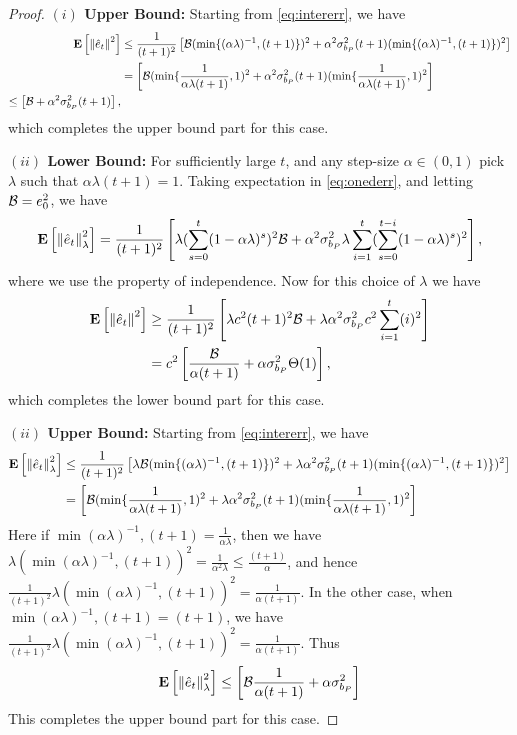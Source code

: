 \begin{proof}
\textbf{$(i)$ Upper Bound:}
Starting from \eqref{eq:intererr}, we have
\begin{align}
\mathbf{E}\left[\left\| \hat{e}_t\right\|^2\right]&\leq \frac{1}{(t+1)^2}\left[\mathcal{B} (\min\{(\alpha\lambda)^{-1},(t+1)\})^2+ \alpha^2 \sigma^2_{b_P} (t+1) (\min\{(\alpha\lambda)^{-1},(t+1)\})^2 \right]\\
&= \left[\mathcal{B} (\min\{\frac{1}{\alpha \lambda (t+1)},1)^2+ \alpha^2 \sigma^2_{b_P} (t+1) (\min\{\frac{1}{\alpha \lambda (t+1)},1)^2 \right]\\
\leq \left[\mathcal{B} + \alpha^2 \sigma^2_{b_P} (t+1) \right], 
\end{align}
which completes the upper bound part for this case.

\textbf{$(ii)$ Lower Bound:}
For sufficiently large $t$, and any step-size $\alpha \in (0,1)$ pick $\lambda$ such that $\alpha \lambda (t+1)=1$. Taking expectation in \eqref{eq:onederr}, and letting $\mathcal{B}=e_0^2$, we have
\begin{align}\label{eq:intererr}
\mathbf{E}\left[\left\| \hat{e}_t\right\|^2_{\lambda}\right]=\frac{1}{(t+1)^2}\left[ \lambda (\sum_{s=0}^t(1-\alpha \lambda)^s)^2 \mathcal{B}+ \alpha^2\sigma^2_{b_P}\lambda \sum_{i=1}^t (\sum_{s=0}^{t-i} (1-\alpha \lambda)^s)^2\right],
\end{align}
where we use the property of independence. Now for this choice of $\lambda$ we have
\begin{align}
\mathbf{E}\left[\left\| \hat{e}_t\right\|^2\right]&\geq \frac{1}{(t+1)^2}\left[ \lambda c^2(t+1)^2 \mathcal{B}+ \lambda \alpha^2\sigma^2_{b_P} c^2\sum_{i=1}^t (i)^2\right]\\
&= c^2\left[\frac{\mathcal{B}}{\alpha (t+1)}+ \alpha  \sigma^2_{b_P} \Theta(1) \right],
\end{align}
which completes the lower bound part for this case.

\textbf{$(ii)$ Upper Bound:}
Starting from \eqref{eq:intererr}, we have
\begin{align}
\mathbf{E}\left[\left\| \hat{e}_t\right\|^2_{\lambda}\right]&\leq \frac{1}{(t+1)^2}\left[\lambda \mathcal{B} (\min\{(\alpha\lambda)^{-1},(t+1)\})^2+ \lambda \alpha^2 \sigma^2_{b_P} (t+1) (\min\{(\alpha\lambda)^{-1},(t+1)\})^2 \right]\\
&= \left[\mathcal{B} (\min\{\frac{1}{\alpha \lambda (t+1)},1)^2+ \lambda \alpha^2 \sigma^2_{b_P} (t+1) (\min\{\frac{1}{\alpha \lambda (t+1)},1)^2 \right]\\
\end{align}
Here if $\min{(\alpha\lambda)^{-1},(t+1)}=\frac{1}{\alpha \lambda}$, then we have $\lambda(\min{(\alpha\lambda)^{-1},(t+1)})^2=\frac{1}{\alpha^2 \lambda}\leq \frac{(t+1)}{\alpha}$, and hence $\frac{1}{(t+1)^2}\lambda(\min{(\alpha\lambda)^{-1},(t+1)})^2=\frac{1}{\alpha (t+1)}$. In the other case, when $\min{(\alpha\lambda)^{-1},(t+1)}=(t+1)$, we have
$\frac{1}{(t+1)^2}\lambda(\min{(\alpha\lambda)^{-1},(t+1)})^2=\frac{1}{\alpha (t+1)}$. Thus
\begin{align}
\mathbf{E}\left[\left\| \hat{e}_t\right\|^2_{\lambda}\right]&\leq \left[\mathcal{B} \frac{1}{\alpha (t+1)}+ \alpha \sigma^2_{b_P} \right]\\
\end{align}
This completes the upper bound part for this case.


\end{proof}
